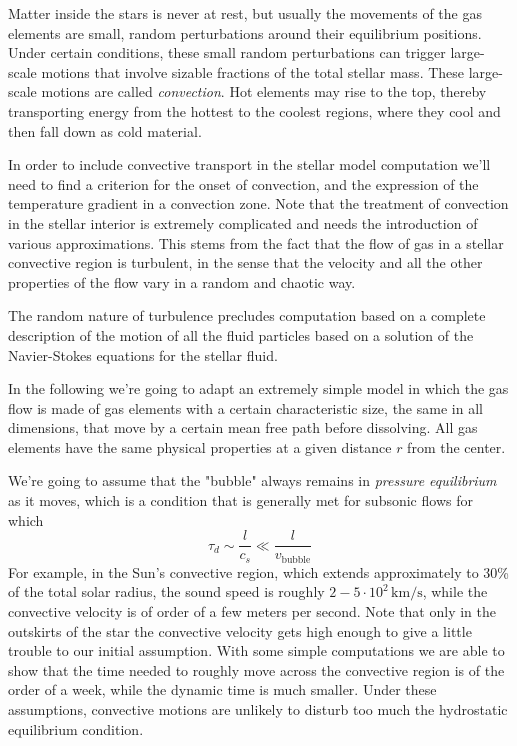 Matter inside the stars is never at rest, but usually the movements of the gas elements are small, random perturbations around their equilibrium positions. Under certain conditions, these small random perturbations can trigger large-scale motions that involve sizable fractions of the total stellar mass. These large-scale motions are called \emph{convection}. Hot elements may rise to the top, thereby transporting energy from the hottest to the coolest regions, where they cool and then fall down as cold material.
\par In order to include convective transport in the stellar model computation we'll need to find a criterion for the onset of convection, and the expression of the temperature gradient in a convection zone. Note that the treatment of convection in the stellar interior is extremely complicated and needs the introduction of various approximations. This stems from the fact that the flow of gas in a stellar convective region is turbulent, in the sense that the velocity and all the other properties of the flow vary in a random and chaotic way.
\par The random nature of turbulence precludes computation based on a complete description of the motion of all the fluid particles based on a solution of the Navier-Stokes equations for the stellar fluid.
\par In the following we're going to adapt an extremely simple model in which the gas flow is made of gas elements with a certain characteristic size, the same in all dimensions, that move by a certain mean free path before dissolving. All gas elements have the same physical properties at a given distance $r$ from the center.

We're going to assume that the "bubble" always remains in \emph{pressure equilibrium} as it moves, which is a condition that is generally met for subsonic flows for which 
\begin{equation*}
	\tau_{d} \sim \frac{l}{c_{s}}\ll \frac{l}{v_{\text{bubble}}}
\end{equation*}
For example, in the Sun's convective region, which extends approximately to 30\% of the total solar radius, the sound speed is roughly $2-5 \cdot 10^{2}\,\text{km}/\text{s}$, while the convective velocity is of order of a few meters per second. Note that only in the outskirts of the star the convective velocity gets high enough to give a little trouble to our initial assumption. With some simple computations we are able to show that the time needed to roughly move across the convective region is of the order of a week, while the dynamic time is much smaller. Under these assumptions, convective motions are unlikely to disturb too much the hydrostatic equilibrium condition.
